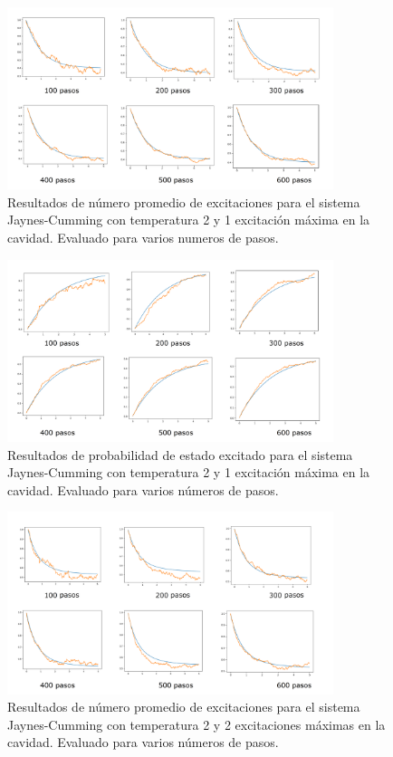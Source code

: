 \documentclass{book}
\begin{document}
\begin{figure}[ht]
    \includegraphics[width=0.85\textwidth]{test0_T2_pob0.png}
    \caption{Resultados de número promedio de excitaciones para el sistema Jaynes-Cumming con temperatura 2 y 1 excitación máxima en la cavidad. Evaluado para varios numeros de pasos.}
\end{figure}

\begin{figure}[ht]
    \includegraphics[width=0.85\textwidth]{test0_T2_pobe.png}
    \caption{Resultados de probabilidad de estado excitado para el sistema Jaynes-Cumming con temperatura 2 y 1 excitación máxima en la cavidad. Evaluado para varios números de pasos.}
\end{figure}

\begin{figure}[ht]
    \includegraphics[width=0.85\textwidth]{test1_T2_pob0.png}
    \caption{Resultados de número promedio de excitaciones para el sistema Jaynes-Cumming con temperatura 2 y 2 excitaciones máximas en la cavidad. Evaluado para varios números de pasos.}
\end{figure}
\end{document}
